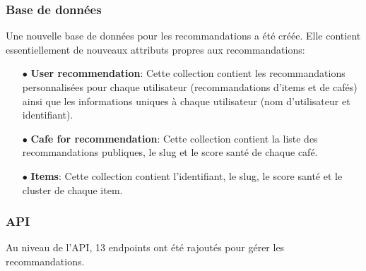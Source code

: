 \documentclass[11pt]{article}
\begin{document}
\subsubsection{Base de données}
Une nouvelle base de données pour les recommandations a été créée. Elle contient essentiellement de nouveaux attributs propres aux recommandations:\\

\begin{itemize}
	\item[$\bullet$] \textbf{User recommendation}: Cette collection contient les recommandations personnalisées pour chaque utilisateur (recommandations d'items et de cafés) ainsi que les informations uniques à chaque utilisateur (nom d'utilisateur et identifiant).\\
	
	\item[$\bullet$] \textbf{Cafe for recommendation}: Cette collection contient la liste des recommandations publiques, le slug et le score santé de chaque café.\\
	
	\item[$\bullet$] \textbf{Items}: Cette collection contient l'identifiant, le slug, le score santé et le cluster de chaque item.\\
\end{itemize}

\subsubsection{API}
Au niveau de l'API, 13 endpoints ont été rajoutés pour gérer les recommandations.\\
\end{document}

